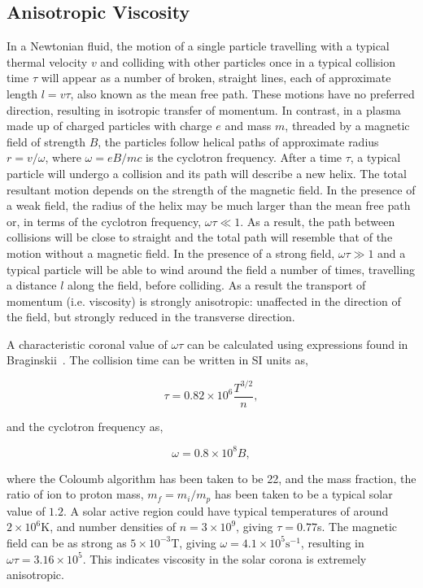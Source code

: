 \subsection{Anisotropic Viscosity}

In a Newtonian fluid, the motion of a single particle travelling with a typical thermal velocity $v$ and colliding with other particles once in a typical collision time $\tau$ will appear as a number of broken, straight lines, each of approximate length $l = v\tau$, also known as the mean free path. These motions have no preferred direction, resulting in isotropic transfer of momentum. In contrast, in a plasma made up of charged particles with charge $e$ and mass $m$, threaded by a magnetic field of strength $B$, the particles follow helical paths of approximate radius $r = v/\omega$, where $\omega = eB/mc$ is the cyclotron frequency. After a time $\tau$, a typical particle will undergo a collision and its path will describe a new helix. The total resultant motion depends on the strength of the magnetic field. In the presence of a weak field, the radius of the helix may be much larger than the mean free path or, in terms of the cyclotron frequency, $\omega \tau \ll 1$. As a result, the path between collisions will be close to straight and the total path will resemble that of the motion without a magnetic field. In the presence of a strong field, $\omega \tau \gg 1$ and a typical particle will be able to wind around the field a number of times, travelling a distance $l$ along the field, before colliding. As a result the transport of momentum (i.e. viscosity) is strongly anisotropic: unaffected in the direction of the field, but strongly reduced in the transverse direction.

A characteristic coronal value of $\omega \tau$ can be calculated using expressions found in Braginskii~\cite{braginskiiTransportProcessesPlasma1965}. The collision time can be written in SI units as,

\begin{equation}
  \label{eq:collision_time}
  \tau = 0.82 \times 10^{6} \frac{T^{3/2}}{n},
\end{equation}

and the cyclotron frequency as,

\begin{equation}
  \label{eq:cyclotron_frequency}
  \omega = 0.8\times10^8 B,
\end{equation}

where the Coloumb algorithm has been taken to be 22, and the mass fraction, the ratio of ion to proton mass, $m_f = m_i/m_p$ has been taken to be a typical solar value of $1.2$. A solar active region could have typical temperatures of around $2\times 10^6$K, and number densities of $n = 3 \times 10^9$, giving $\tau = 0.77$s. The magnetic field can be as strong as $5\times 10^{-3}$T, giving $\omega = 4.1 \times 10^5 \text{s}^{-1}$, resulting in $\omega \tau = 3.16 \times 10^5$. This indicates viscosity in the solar corona is extremely anisotropic.

